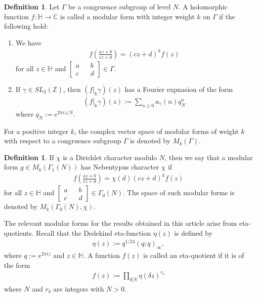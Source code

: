 \documentclass[12pt]{amsart}
\theoremstyle{plain}
\theoremstyle{definition}
\newtheorem{definition}[theorem]{Definition}
\begin{document}
	\begin{definition}
		Let $\Gamma$ be a congruence subgroup of level $N$. A holomorphic function $f:\mathbb{H} \rightarrow \mathbb{C}$ is called a modular form with integer weight $k$ on $\Gamma$ if the following hold:
		\begin{enumerate}[$(1)$]
			\item We have
			\begin{align*}
				f \left( \frac{az+b}{cz+d}\right)=(cz+d)^{k} f(z)
			\end{align*}
			for all $z \in \mathbb{H}$ and $\begin{bmatrix}
				a && b \\c && d
			\end{bmatrix}\in \Gamma$. 
			\item If $\gamma\in SL_2 (\mathbb{Z})$, then $(f|_{k} \gamma)(z)$ has a Fourier expnasion of the form
			\begin{align*}
				(f|_{k} \gamma)(z):= \sum \limits_{n\geq 0}a_{\gamma}(n) q_N^{n}
			\end{align*}
			where $q_N:=e^{2\pi i z /N}$.
		\end{enumerate}
	\end{definition}
	For a positive integer $k$, the complex vector space of modular forms of weight $k$ with respect to a congruence subgroup $\Gamma$ is denoted by $M_{k}(\Gamma)$.
	
	\begin{definition} \cite[Definition 1.15]{Ono2004}
		If $\chi$ is a Dirichlet character modulo $N$, then we say that a modular form $g \in M_{k}(\Gamma_1(N))$ has Nebentypus character $\chi$ if 
		\begin{align*}
			f \left( \frac{az+b}{cz+d}\right)=\chi(d) (cz+d)^{k} f(z)
		\end{align*}
		for all $z \in \mathbb{H}$ and $\begin{bmatrix}
			a && b \\c && d
		\end{bmatrix}\in \Gamma_{0}(N)$. The space of such modular forms is denoted by $M_{k}(\Gamma_0(N), \chi)$.
	\end{definition}
	
	The relevant modular forms for the results obtained in this article arise from eta-quotients. Recall that the Dedekind eta-function $\eta (z)$ is defined by 
	\begin{align*}
		\eta (z):= q^{1/24}(q;q)_{\infty},
	\end{align*}
	where $q:=e^{2\pi i z}$ and $z \in \mathbb{H}$. A function $f(z)$ is called an eta-quotient if it is of the form
	\begin{align*}
		f(z):= \prod\limits_{\delta|N} \eta(\delta z)^{r_{\delta}}
	\end{align*}
	where $N$ and $r_{\delta}$ are integers with $N>0$. 
	
\end{document}
